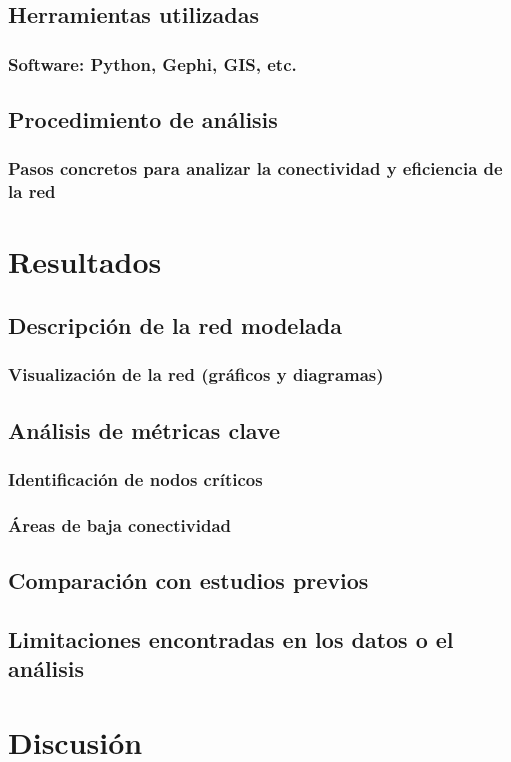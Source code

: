 \documentclass[openany]{book}
\begin{document}
	\section{Herramientas utilizadas}
		\subsection{Software: Python, Gephi, GIS, etc.}
	\section{Procedimiento de análisis}
		\subsection{Pasos concretos para analizar la conectividad y eficiencia de la red}

\chapter{Resultados}
	\section{Descripción de la red modelada}
		\subsection{Visualización de la red (gráficos y diagramas)}
	\section{Análisis de métricas clave}
		\subsection{Identificación de nodos críticos}
		\subsection{Áreas de baja conectividad}
	\section{Comparación con estudios previos}
	\section{Limitaciones encontradas en los datos o el análisis}

\chapter{Discusión}
\end{document}
